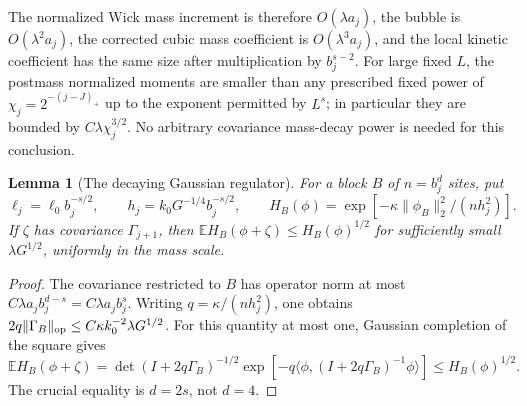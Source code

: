 \documentclass[11pt]{article}
\newtheorem{lemma}[proposition]{Lemma}
\begin{document}
The normalized Wick mass increment is therefore \(O(\lambda a_j)\),
the bubble is \(O(\lambda^2a_j)\), the corrected cubic mass coefficient
is \(O(\lambda^3a_j)\), and the local kinetic coefficient has the same
size after multiplication by \(b_j^{s-2}\). For large fixed \(L\),
the postmass normalized moments are smaller than any prescribed fixed
power of \(\chi_j=2^{-(j-J)_+}\) up to the exponent permitted by
\(L^s\); in particular they are bounded by \(C\lambda\chi_j^{3/2}\).
No arbitrary covariance mass-decay power is needed for this conclusion.

\begin{lemma}[The decaying Gaussian regulator]
\label{completion:H}
For a block \(B\) of \(n=b_j^d\) sites, put
\[
 \ell_j=\ell_0b_j^{-s/2},\qquad
 h_j=k_0G^{-1/4}b_j^{-s/2},\qquad
 H_B(\phi)=\exp[-\kappa\|\phi_B\|_2^2/(nh_j^2)].
\]
If \(\zeta\) has covariance \(\Gamma_{j+1}\), then
\(\mathbb EH_B(\phi+\zeta)\le H_B(\phi)^{1/2}\) for sufficiently
small \(\lambda G^{1/2}\), uniformly in the mass scale.
\end{lemma}
\begin{proof}
The covariance restricted to \(B\) has operator norm at most
\(C\lambda a_j b_j^{d-s}=C\lambda a_jb_j^s\).
Writing \(q=\kappa/(nh_j^2)\), one obtains
\(2q\|\Gamma_B\|_{\rm op}\le C\kappa k_0^{-2}\lambda G^{1/2}\).
For this quantity at most one, Gaussian completion of the square gives
\[
 \mathbb EH_B(\phi+\zeta)
 =\det(I+2q\Gamma_B)^{-1/2}
 \exp[-q\langle\phi,(I+2q\Gamma_B)^{-1}\phi\rangle]
 \le H_B(\phi)^{1/2}.
\]
The crucial equality is \(d=2s\), not \(d=4\).
\end{proof}
\end{document}
